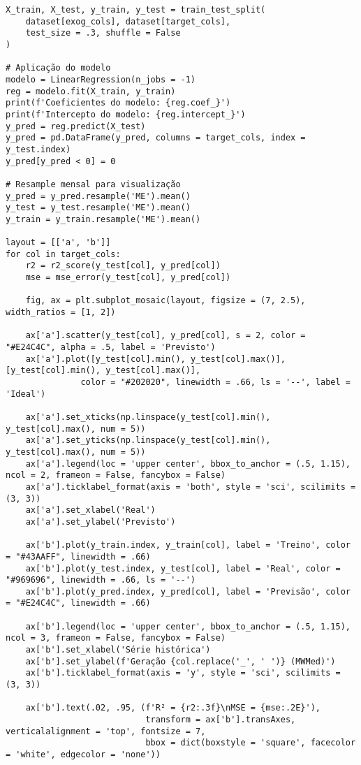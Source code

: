 \begin{apendicesenv}
\begin{verbatim}
X_train, X_test, y_train, y_test = train_test_split(
    dataset[exog_cols], dataset[target_cols], 
    test_size = .3, shuffle = False
)

# Aplicação do modelo
modelo = LinearRegression(n_jobs = -1)
reg = modelo.fit(X_train, y_train)
print(f'Coeficientes do modelo: {reg.coef_}')
print(f'Intercepto do modelo: {reg.intercept_}')
y_pred = reg.predict(X_test)
y_pred = pd.DataFrame(y_pred, columns = target_cols, index = y_test.index) 
y_pred[y_pred < 0] = 0

# Resample mensal para visualização
y_pred = y_pred.resample('ME').mean()
y_test = y_test.resample('ME').mean()
y_train = y_train.resample('ME').mean()

layout = [['a', 'b']]
for col in target_cols:
    r2 = r2_score(y_test[col], y_pred[col])
    mse = mse_error(y_test[col], y_pred[col])

    fig, ax = plt.subplot_mosaic(layout, figsize = (7, 2.5), width_ratios = [1, 2])

    ax['a'].scatter(y_test[col], y_pred[col], s = 2, color = "#E24C4C", alpha = .5, label = 'Previsto')
    ax['a'].plot([y_test[col].min(), y_test[col].max()], [y_test[col].min(), y_test[col].max()], 
               color = "#202020", linewidth = .66, ls = '--', label = 'Ideal')
    
    ax['a'].set_xticks(np.linspace(y_test[col].min(), y_test[col].max(), num = 5))
    ax['a'].set_yticks(np.linspace(y_test[col].min(), y_test[col].max(), num = 5))
    ax['a'].legend(loc = 'upper center', bbox_to_anchor = (.5, 1.15), ncol = 2, frameon = False, fancybox = False)
    ax['a'].ticklabel_format(axis = 'both', style = 'sci', scilimits = (3, 3))
    ax['a'].set_xlabel('Real')
    ax['a'].set_ylabel('Previsto')
    
    ax['b'].plot(y_train.index, y_train[col], label = 'Treino', color = "#43AAFF", linewidth = .66)
    ax['b'].plot(y_test.index, y_test[col], label = 'Real', color = "#969696", linewidth = .66, ls = '--')
    ax['b'].plot(y_pred.index, y_pred[col], label = 'Previsão', color = "#E24C4C", linewidth = .66)
    
    ax['b'].legend(loc = 'upper center', bbox_to_anchor = (.5, 1.15), ncol = 3, frameon = False, fancybox = False)
    ax['b'].set_xlabel('Série histórica')
    ax['b'].set_ylabel(f'Geração {col.replace('_', ' ')} (MWMed)')
    ax['b'].ticklabel_format(axis = 'y', style = 'sci', scilimits = (3, 3))

    ax['b'].text(.02, .95, (f'R² = {r2:.3f}\nMSE = {mse:.2E}'), 
                            transform = ax['b'].transAxes, verticalalignment = 'top', fontsize = 7,
                            bbox = dict(boxstyle = 'square', facecolor = 'white', edgecolor = 'none'))
    

\end{verbatim}
\end{apendicesenv}
